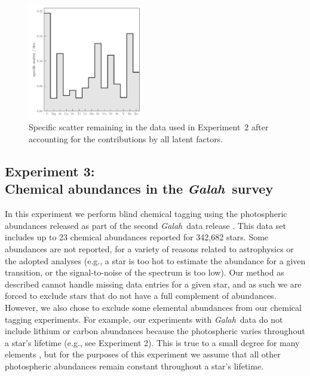 \documentclass[twocolumn]{aastex62}
\newcommand{\project}[1]{\textsl{#1}}
\newcommand{\Galah}{\project{Galah}}
\begin{document}



\begin{figure}
	\includegraphics[width=0.45\textwidth]{experiments/exp2-log-xfe-offset-specific-scatter.pdf}
	\caption{Specific scatter remaining in the \citet{Barklem:2005} data used in
			 Experiment~2 after accounting for the contributions by all latent
			 factors.}
    \label{fig:exp2-specific-scatter}
\end{figure}



\subsection{Experiment 3:\\Chemical abundances in the \Galah\ survey}
\label{sec:exp4}

In this experiment we perform blind chemical tagging using the 
photospheric abundances released as part of the second \Galah\ 
data release \citep{Buder:2018}. This data set includes
up to 23 chemical abundances reported for 342,682 stars.
Some abundances are not reported, for a variety of 
reasons related to astrophysics or the adopted analyses
(e.g., a star is too hot to estimate the abundance for a given
transition, or the signal-to-noise of the spectrum is too low).
Our method as described cannot handle missing data entries for
a given star, and as such we are forced to exclude stars that
do not have a full complement of abundances. However, we also
chose to exclude some elemental abundances from our chemical
tagging experiments. For example, our experiments
with \Galah\ data do not include lithium or carbon abundances because the
photospheric varies throughout a star's lifetime (e.g., see Experiment 2). This is true
to a small degree for many elements \citep[e.g.,][]{Dotter:2017},
but for the purposes of this experiment we assume that all other
photospheric abundances remain constant throughout  a star's
lifetime.
\end{document}
